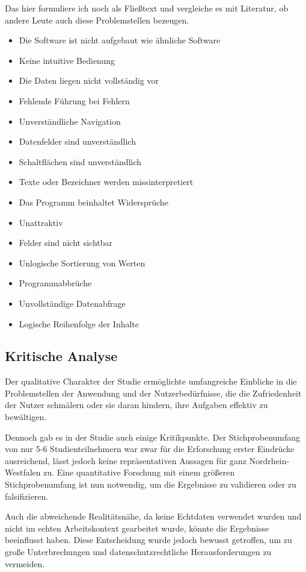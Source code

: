 Das hier formuliere ich noch als Fließtext und vergleiche es mit Literatur, ob andere Leute auch diese Problemstellen bezeugen.
\begin{itemize}
     \item Die Software ist nicht aufgebaut wie ähnliche Software
     \item Keine intuitive Bedienung
     \item Die Daten liegen nicht vollständig vor
     \item Fehlende Führung bei Fehlern
     \item Unverständliche Navigation
     \item Datenfelder sind unverständlich
     \item Schaltflächen sind unverständlich
     \item Texte oder Bezeichner werden missinterpretiert
     \item Das Programm beinhaltet Widersprüche
     \item Unattraktiv
     \item Felder sind nicht sichtbar
     \item Unlogische Sortierung von Werten
     \item Programmabbrüche
     \item Unvollständige Datenabfrage
     \item Logische Reihenfolge der Inhalte
\end{itemize}


\subsection{Kritische Analyse}
Der qualitative Charakter der Studie ermöglichte umfangreiche Einblicke in die Problemstellen der Anwendung und der Nutzerbedürfnisse, die die Zufriedenheit der Nutzer schmälern oder sie daran hindern, ihre Aufgaben effektiv zu bewältigen. 

Dennoch gab es in der Studie auch einige Kritikpunkte. Der Stichprobenumfang von nur 5-6 Studienteilnehmern war zwar für die Erforschung erster Eindrücke ausreichend, lässt jedoch keine repräsentativen Aussagen für ganz Nordrhein-Westfalen zu. Eine quantitative Forschung mit einem größeren Stichprobenumfang ist nun notwendig, um die Ergebnisse zu validieren oder zu falsifizieren.

Auch die abweichende Realitätsnähe, da keine Echtdaten verwendet wurden und nicht im echten Arbeitskontext gearbeitet wurde, könnte die Ergebnisse beeinflusst haben. Diese Entscheidung wurde jedoch bewusst getroffen, um zu große Unterbrechungen und datenschutzrechtliche Herausforderungen zu vermeiden.

